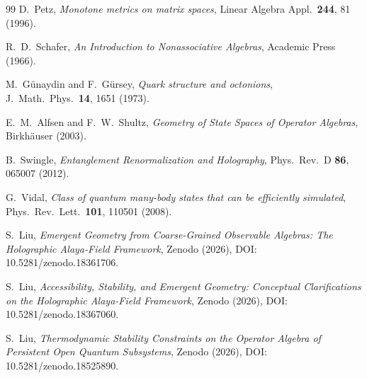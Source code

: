 \documentclass[12pt]{article}
\begin{document}
\begin{thebibliography}{99}
D.~Petz, \emph{Monotone metrics on matrix spaces}, Linear Algebra Appl.\ \textbf{244}, 81 (1996).

R.~D.~Schafer, \emph{An Introduction to Nonassociative Algebras}, Academic Press (1966).

M.~G\"unaydin and F.~G\"ursey, \emph{Quark structure and octonions}, J.\ Math.\ Phys.\ \textbf{14}, 1651 (1973).

E.~M.~Alfsen and F.~W.~Shultz, \emph{Geometry of State Spaces of Operator Algebras}, Birkh\"auser (2003).

B.~Swingle, \emph{Entanglement Renormalization and Holography}, Phys.\ Rev.\ D \textbf{86}, 065007 (2012).

G.~Vidal, \emph{Class of quantum many-body states that can be efficiently simulated}, Phys.\ Rev.\ Lett.\ \textbf{101}, 110501 (2008).

S.~Liu, \emph{Emergent Geometry from Coarse-Grained Observable Algebras: The Holographic Alaya-Field Framework}, Zenodo (2026), DOI: 10.5281/zenodo.18361706.

S.~Liu, \emph{Accessibility, Stability, and Emergent Geometry: Conceptual Clarifications on the Holographic Alaya-Field Framework}, Zenodo (2026), DOI: 10.5281/zenodo.18367060.

S.~Liu, \emph{Thermodynamic Stability Constraints on the Operator Algebra of Persistent Open Quantum Subsystems}, Zenodo (2026), DOI: 10.5281/zenodo.18525890.

\end{thebibliography}
\end{document}
